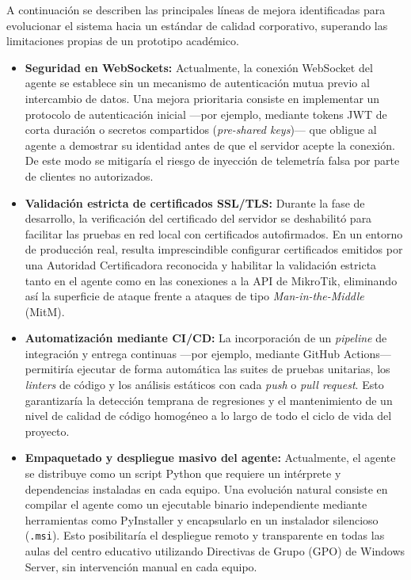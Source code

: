 \documentclass[12pt, a4paper, twoside]{article}
\begin{document}
A continuación se describen las principales líneas de mejora identificadas para evolucionar el sistema hacia un estándar de calidad corporativo, superando las limitaciones propias de un prototipo académico.

\begin{itemize}
  \item \textbf{Seguridad en WebSockets:} Actualmente, la conexión WebSocket del agente se establece sin un mecanismo de autenticación mutua previo al intercambio de datos. Una mejora prioritaria consiste en implementar un protocolo de autenticación inicial ---por ejemplo, mediante tokens JWT de corta duración o secretos compartidos (\textit{pre-shared keys})--- que obligue al agente a demostrar su identidad antes de que el servidor acepte la conexión. De este modo se mitigaría el riesgo de inyección de telemetría falsa por parte de clientes no autorizados.

  \item \textbf{Validación estricta de certificados SSL/TLS:} Durante la fase de desarrollo, la verificación del certificado del servidor se deshabilitó para facilitar las pruebas en red local con certificados autofirmados. En un entorno de producción real, resulta imprescindible configurar certificados emitidos por una Autoridad Certificadora reconocida y habilitar la validación estricta tanto en el agente como en las conexiones a la API de MikroTik, eliminando así la superficie de ataque frente a ataques de tipo \textit{Man-in-the-Middle} (MitM).

  \item \textbf{Automatización mediante CI/CD:} La incorporación de un \textit{pipeline} de integración y entrega continuas ---por ejemplo, mediante GitHub Actions--- permitiría ejecutar de forma automática las suites de pruebas unitarias, los \textit{linters} de código y los análisis estáticos con cada \textit{push} o \textit{pull request}. Esto garantizaría la detección temprana de regresiones y el mantenimiento de un nivel de calidad de código homogéneo a lo largo de todo el ciclo de vida del proyecto.

  \item \textbf{Empaquetado y despliegue masivo del agente:} Actualmente, el agente se distribuye como un script Python que requiere un intérprete y dependencias instaladas en cada equipo. Una evolución natural consiste en compilar el agente como un ejecutable binario independiente mediante herramientas como PyInstaller y encapsularlo en un instalador silencioso (\texttt{.msi}). Esto posibilitaría el despliegue remoto y transparente en todas las aulas del centro educativo utilizando Directivas de Grupo (GPO) de Windows Server, sin intervención manual en cada equipo.


\end{itemize}
\end{document}

